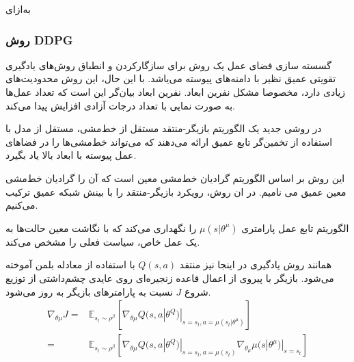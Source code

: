 ‌به‌ازای
\subsubsection{روش DDPG}

گسسته سازی فضای عمل یک روش برای سازگار‌کردن و انطباق روش‌های یادگیری تقویتی عمیق نظیر 
با دامنه‌های پیوسته می‌یاشد. با این حال، این روش محدودیت‌های زیادی دارد، مخصوصا مشکل نفرین ابعاد.  نفرین ابعاد بیان‌گر این است که تعداد عمل‌ها به صورت نمایی با تعداد درجات آزادی افزایش پیدا می‌کند. 

در روشی جدید یک الگوریتم بازیگر-منتقد مستقل از خط‌مشی، مستقل از مدل
 با استفاده از تخمین‌گر تابع عمیق ارائه می‌دهند که می‌تواند خط‌مشی‌ها را در فضاهای عمل پیوسته با ابعاد بالا یاد بگیرد.

این روش بر اساس الگوریتم گرادیان خط‌مشی معین
است که آن را
گرادیان خط‌مشی معین عمیق
می نامیم. 
 در ان روش، رویکرد بازیگر-منتقد را با بینش شبکه  عمیق
   ترکیب می‌کنیم.
   
   
الگوریتم 
 تابع عمل پارامتری
$
	\mu (s|\theta^\mu)	
$
  را نگهداری می‌کند که با نگاشت معین حالت‌ها به یک عمل خاص، سیاست فعلی را مشخص می‌کند.

همانند روش یادگیری 
در اینجا نیز منتقد
$Q(s,a)$
 با استفاده از معادله بلمن آموخته می‌شود.
 بازیگر با پیروی از اعمال قاعده زنجیره‌ای روی عایدی چشم‌داشتی از توزیع شروع
 $J$
  نسبت به پارامترهای بازیگر به روز می‌شود.
\begin{align}
	\nabla_{\theta \mu} J = & \mathbb{E}_{s_t \sim \rho ^{ \beta}} [ \nabla_{\theta \mu} Q(s,a|\theta^Q)|_{s=s_t,a=\mu (s_t|\theta^{\mu})}  ] \\ \nonumber
	= & \mathbb{E}_{s_t \sim \rho ^{ \beta}} [ \nabla_{\theta \mu} Q(s,a|\theta^Q)|_{s=s_t, a=\mu (s_t)} \nabla_{\theta_{\mu}} \mu (s|\theta^{\mu})|_{s=s_t} ]
\end{align}

